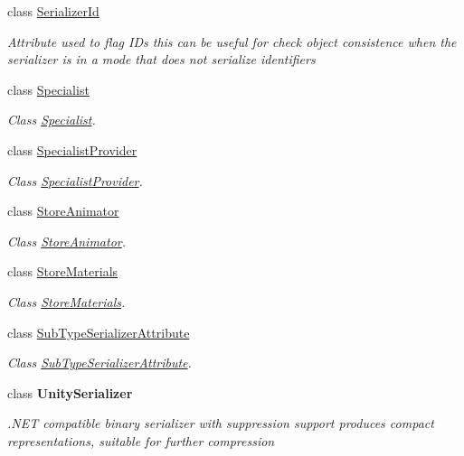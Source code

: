 \begin{DoxyCompactItemize}
class \hyperlink{class_serialization_1_1_serializer_id}{Serializer\+Id}
\begin{DoxyCompactList}\small\item\em Attribute used to flag I\+Ds this can be useful for check object consistence when the serializer is in a mode that does not serialize identifiers \end{DoxyCompactList}\item 
class \hyperlink{class_serialization_1_1_specialist}{Specialist}
\begin{DoxyCompactList}\small\item\em Class \hyperlink{class_serialization_1_1_specialist}{Specialist}. \end{DoxyCompactList}\item 
class \hyperlink{class_serialization_1_1_specialist_provider}{Specialist\+Provider}
\begin{DoxyCompactList}\small\item\em Class \hyperlink{class_serialization_1_1_specialist_provider}{Specialist\+Provider}. \end{DoxyCompactList}\item 
class \hyperlink{class_serialization_1_1_store_animator}{Store\+Animator}
\begin{DoxyCompactList}\small\item\em Class \hyperlink{class_serialization_1_1_store_animator}{Store\+Animator}. \end{DoxyCompactList}\item 
class \hyperlink{class_serialization_1_1_store_materials}{Store\+Materials}
\begin{DoxyCompactList}\small\item\em Class \hyperlink{class_serialization_1_1_store_materials}{Store\+Materials}. \end{DoxyCompactList}\item 
class \hyperlink{class_serialization_1_1_sub_type_serializer_attribute}{Sub\+Type\+Serializer\+Attribute}
\begin{DoxyCompactList}\small\item\em Class \hyperlink{class_serialization_1_1_sub_type_serializer_attribute}{Sub\+Type\+Serializer\+Attribute}. \end{DoxyCompactList}\item 
class {\bfseries Unity\+Serializer}
\begin{DoxyCompactList}\small\item\em .N\+ET compatible binary serializer with suppression support produces compact representations, suitable for further compression \end{DoxyCompactList}\end{DoxyCompactItemize}
